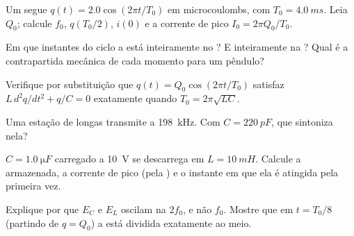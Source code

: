 \begin{exercise}[$\star$]\label{exo:g12:rlc-oscillations:4}
Um  segue $q(t) = 2.0\cos(2\pi t/T_0)$ em microcoulombs, com
$T_0 = \qty{4.0}{ms}$. Leia $Q_0$; calcule $f_0$, $q(T_0/2)$, $i(0)$ e a corrente de
pico $I_0 = 2\pi Q_0/T_0$.
\end{exercise}

\begin{exercise}[$\star$]\label{exo:g12:rlc-oscillations:5}
Em que instantes do ciclo a  está inteiramente no ? E inteiramente na
? Qual é a contrapartida mecânica de cada momento para um pêndulo?
\end{exercise}

\begin{exercise}[$\star\star$]\label{exo:g12:rlc-oscillations:6}
Verifique por substituição que $q(t) = Q_0\cos(2\pi t/T_0)$ satisfaz
$L\,d^2q/dt^2 + q/C = 0$ exatamente quando $T_0 = 2\pi\sqrt{LC}$.
\end{exercise}

\begin{exercise}[$\star\star$]\label{exo:g12:rlc-oscillations:7}
Uma estação de  longas transmite a \qty{198}{kHz}. Com $C = \qty{220}{pF}$, que
 sintoniza nela?
\end{exercise}

\begin{exercise}[$\star\star$]\label{exo:g12:rlc-oscillations:8}
$C = \qty{1.0}{\micro F}$ carregado a \qty{10}{V} se descarrega em $L = \qty{10}{mH}$.
Calcule a  armazenada, a corrente de pico (pela ) e o
instante em que ela é atingida pela primeira vez.
\end{exercise}

\begin{exercise}[$\star\star$]\label{exo:g12:rlc-oscillations:9}
Explique por que $E_C$ e $E_L$ oscilam na  $2f_0$, e não $f_0$. Mostre que em
$t = T_0/8$ (partindo de $q = Q_0$) a  está dividida exatamente ao meio.
\end{exercise}

